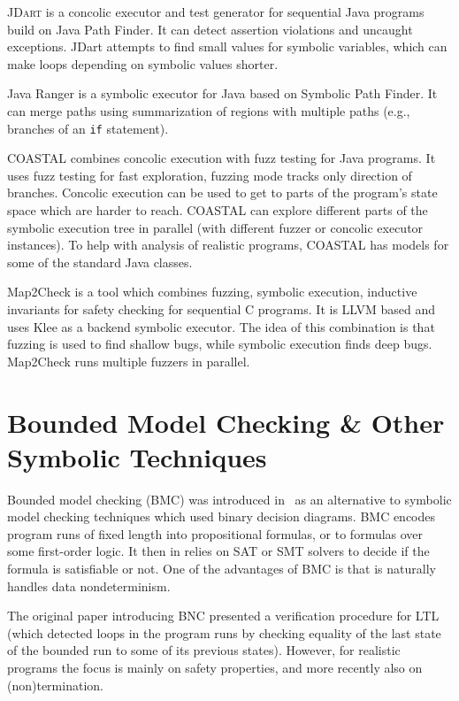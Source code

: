 \textsc{JDart}  is a concolic executor and test generator for sequential Java programs build on Java Path Finder.
It can detect assertion violations and uncaught exceptions.
JDart attempts to find small values for symbolic variables, which can make loops depending on symbolic values shorter.

Java Ranger  is a symbolic executor for Java based on Symbolic Path Finder.
It can merge paths using summarization of regions with multiple paths (e.g., branches of an \texttt{if} statement). %

COASTAL  combines concolic execution with fuzz testing for Java programs.
It uses fuzz testing for fast exploration, fuzzing mode tracks only direction of branches.
Concolic execution can be used to get to parts of the program's state space which are harder to reach.
COASTAL can explore different parts of the symbolic execution tree in parallel (with different fuzzer or concolic executor instances).
To help with analysis of realistic programs, COASTAL has models for some of the standard Java classes. %

Map2Check  is a tool which combines fuzzing, symbolic execution, inductive invariants for safety checking for sequential C programs.
It is LLVM based and uses Klee as a backend symbolic executor.
The idea of this combination is that fuzzing is used to find shallow bugs, while symbolic execution finds deep bugs.
Map2Check runs multiple fuzzers in parallel.



\section{Bounded Model Checking \& Other Symbolic Techniques}\label{sec:stateoftheart:bmc}

Bounded model checking (BMC) was introduced in~ as an alternative to
symbolic model checking techniques which used binary decision diagrams.
BMC encodes program runs of fixed length into propositional formulas, or to
formulas over some first-order logic.
It then in relies on SAT or SMT solvers to decide if the formula is satisfiable
or not.
One of the advantages of BMC is that is naturally handles data nondeterminism.

The original paper introducing BNC presented a verification procedure for LTL
(which detected loops in the program runs by checking equality of the last
state of the bounded run to some of its previous states).
However, for realistic programs the focus is mainly on safety properties, and
more recently also on (non)termination.

